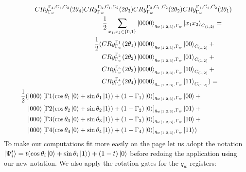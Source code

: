 \begin{equation}
   \resizebox{.9\hsize}{!}{$\begin{split}
        CRy_{\Gamma_w}^{\Gamma_4,C_1,C_2}(2\theta_4)CRy_{\Gamma_w}^{\Gamma_3,\bar{C_1},C_2}(2\theta_3)CRy_{\Gamma_w}^{\Gamma_2,C_1,\bar{C_2}}(2\theta_2)&CRy_{\Gamma_w}^{\Gamma_1,\bar{C_1},\bar{C_2}}(2\theta_1)\\
        \frac{1}{2}\sum_{x_1,x_2\in\{0,1\}}\ket{0000}_{q_{w(1,2,3)},\Gamma_w}&\ket{ x_1x_2}_{C_{(1,2)}}=\\
        \frac{1}{2}(
        CRy_{\Gamma_w}^{\Gamma_1}(2\theta_1)\ket{0000}_{q_{w(1,2,3)},\Gamma_w}&\ket{ 00}_{C_{(1,2)}}+\\
        CRy_{\Gamma_w}^{\Gamma_2}(2\theta_2)\ket{0000}_{q_{w(1,2,3)},\Gamma_w}&\ket{ 01}_{C_{(1,2)}}+\\
        CRy_{\Gamma_w}^{\Gamma_3}(2\theta_3)\ket{0000}_{q_{w(1,2,3)},\Gamma_w}&\ket{ 10}_{C_{(1,2)}}+\\
        CRy_{\Gamma_w}^{\Gamma_4}(2\theta_4)\ket{0000}_{q_{w(1,2,3)},\Gamma_w}&\ket{ 11}_{C_{(1,2)}})=\\
        \frac{1}{2}(
        \ket{000}[\Gamma1(\cos\theta_1\ket{0}+\sin\theta_1\ket{1})+(1-\Gamma_1)\ket{0}]_{q_{w(1,2,3)},\Gamma_w}&\ket{ 00}+\\
        \ket{000}[\Gamma2(\cos\theta_2\ket{0}+\sin\theta_2\ket{1})+(1-\Gamma_2)\ket{0}]_{q_{w(1,2,3)},\Gamma_w}&\ket{ 01}+\\
        \ket{000}[\Gamma3(\cos\theta_3\ket{0}+\sin\theta_3\ket{1})+(1-\Gamma_3)\ket{0}]_{q_{w(1,2,3)},\Gamma_w}&\ket{ 10}+\\
        \ket{000}[\Gamma4(\cos\theta_4\ket{0}+\sin\theta_4\ket{1})+(1-\Gamma_4)\ket{0}]_{q_{w(1,2,3)},\Gamma_w}&\ket{ 11}
        )
   \end{split}$}
\end{equation}
To make our computations fit more easily on the page let us adopt the notation $\ket{\Psi^t_i}=t(\cos\theta_i\ket{0}+\sin\theta_i\ket{1})+(1-t)\ket{0}$ before redoing the application using our new notation. We also apply the rotation gates for the $q_w$ registers:
